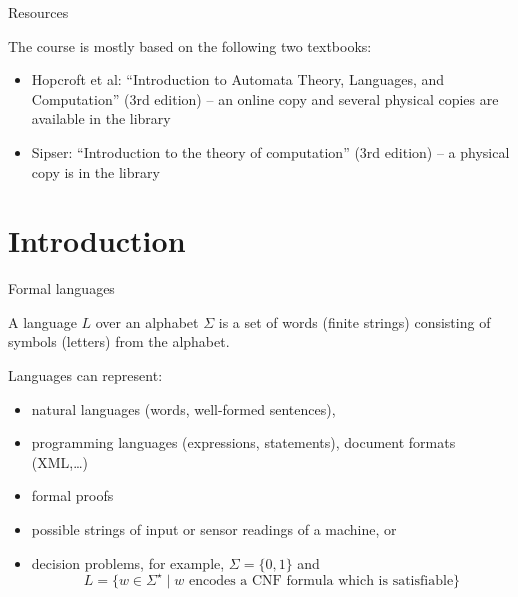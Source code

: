 \documentclass[handout]{beamer}
\begin{document}
\begin{frame}{Resources}

    The course is mostly based on the following two textbooks:

    \begin{itemize}
        \item \alert{Hopcroft} et al: ``Introduction to Automata Theory, Languages, and Computation'' (3rd edition) -- an online copy and several physical copies are available in the library
        \item \alert{Sipser}: ``Introduction to the theory of computation'' (3rd edition) -- a physical copy is in the library
    \end{itemize}    

\end{frame}


\section{\sc Introduction}


\begin{frame}{Formal languages}

    A \alert{language} $L$ over an \alert{alphabet} $\Sigma$ is a set of \alert{words} (finite strings) consisting of symbols (letters) from the alphabet. 

    Languages can represent:
    \begin{itemize}
        \item natural languages (words, well-formed sentences), 
        \item programming languages (expressions, statements), document formats (XML,\dots)
        \item formal proofs
        \item possible strings of input or sensor readings of a machine, or 
        \item \alert{decision problems}, for example, $\Sigma = \{0, 1\}$ and 
        $$L = \{w \in \Sigma^\star\mid w\text{ encodes a CNF formula which is satisfiable}\}$$
    \end{itemize}

\end{frame}
\end{document}
